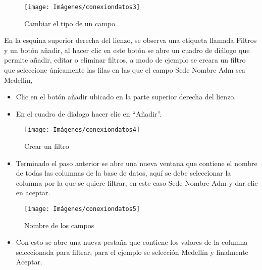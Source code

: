 \documentclass[
]{book}
\providecommand{\tightlist}{%
  \setlength{\itemsep}{0pt}\setlength{\parskip}{0pt}}
\begin{document}
\begin{figure}

{\centering \texttt{[image: Imágenes/conexiondatos3]} 

}

\caption{Cambiar el tipo de un campo}\label{fig:cambiartipocampo-fig}
\end{figure}

En la esquina superior derecha del lienzo, se observa una etiqueta llamada Filtros y un botón añadir, al hacer clic en este botón se abre un cuadro de diálogo que permite añadir, editar o eliminar filtros, a modo de ejemplo se creara un filtro que seleccione únicamente las filas en las que el campo Sede Nombre Adm sea Medellín,

\begin{itemize}
\item
  Clic en el botón añadir ubicado en la parte superior derecha del lienzo.
\item
  En el cuadro de dialogo hacer clic en ``Añadir''.
\end{itemize}

\begin{figure}

{\centering \texttt{[image: Imágenes/conexiondatos4]} 

}

\caption{Crear un filtro}\label{fig:crearfiltro-fig}
\end{figure}

\begin{itemize}
\tightlist
\item
  Terminado el paso anterior se abre una nueva ventana que contiene el nombre de todas las columnas de la base de datos, aquí se debe seleccionar la columna por la que se quiere filtrar, en este caso Sede Nombre Adm y dar clic en aceptar.
\end{itemize}

\begin{figure}

{\centering \texttt{[image: Imágenes/conexiondatos5]} 

}

\caption{Nombre de los campos}\label{fig:nombrecamposfiltro-fig}
\end{figure}

\begin{itemize}
\tightlist
\item
  Con esto se abre una nueva pestaña que contiene los valores de la columna seleccionada para filtrar, para el ejemplo se selección Medellín y finalmente Aceptar.
\end{itemize}
\end{document}
